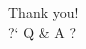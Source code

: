 \documentclass[11pt,aspectratio=169]{beamer}
\begin{document}



\appendix
\begin{frame}{}
    \centering\Huge
	Thank you! \\ 
    \vspace{2cm}
	?` Q \& A ?
\end{frame}
\end{document}

